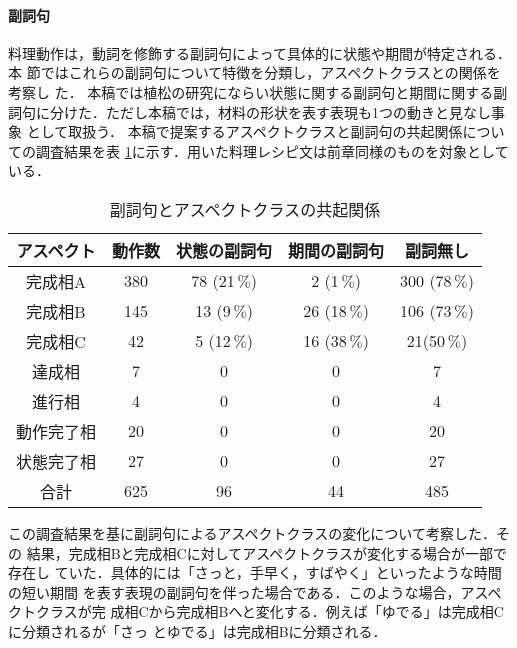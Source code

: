 \paragraph{副詞句}
料理動作は，動詞を修飾する副詞句によって具体的に状態や期間が特定される．本
節ではこれらの副詞句について特徴を分類し，アスペクトクラスとの関係を考察し
た．
本稿では植松\cite{uematu}の研究にならい状態に関する副詞句と期間に関する副
詞句に分けた．ただし本稿では，材料の形状を表す表現も1つの動きと見なし事象
として取扱う．
本稿で提案するアスペクトクラスと副詞句の共起関係についての調査結果を表
\ref{tab:9}に示す．用いた料理レシピ文は前章同様のものを対象としている．

\begin{table}[b]
\begin{center}
\caption{副詞句とアスペクトクラスの共起関係}\label{tab:9}
    \begin{tabular}{|c|c|c|c|c|} \hline
アスペクト & 動作数 & 状態の副詞句  & 期間の副詞句  & 副詞無し \\ \hline\hline
完成相A    &   380  &     78 (21$\,\%$)&     2  (1$\,\%$) & 300 (78$\,\%$)  \\ \hline
完成相B    &   145  &     13 (9$\,\%$) &     26 (18$\,\%$)& 106 (73$\,\%$)  \\ \hline
完成相C    &   42   &     5  (12$\,\%$)&      16 (38$\,\%$)&  21(50$\,\%$) \\ \hline
達成相     &   7    &     0         &      0        &  7       \\ \hline
進行相     &   4    &     0         &      0        &  4       \\ \hline
動作完了相 &   20   &     0         &      0        &  20      \\ \hline
状態完了相 &   27   &     0         &      0        &  27      \\ \hline\hline
合計       &   625  &     96        &     44        &  485      \\ \hline     
    \end{tabular}
\end{center}
\end{table}


この調査結果を基に副詞句によるアスペクトクラスの変化について考察した．その
結果，完成相Bと完成相Cに対してアスペクトクラスが変化する場合が一部で存在し
ていた．具体的には「さっと，手早く，すばやく」といったような時間の短い期間
を表す表現の副詞句を伴った場合である．このような場合，アスペクトクラスが完
成相Cから完成相Bへと変化する．例えば「ゆでる」は完成相Cに分類されるが「さっ
とゆでる」は完成相Bに分類される．

